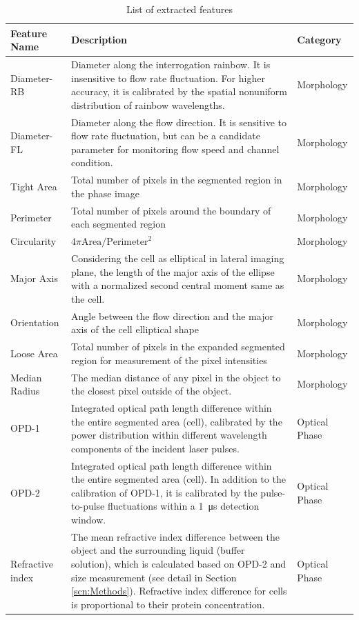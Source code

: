 \documentclass[aps,pra,reprint,longbibliography,superscriptaddress]{revtex4-1}
\begin{document}
\begin{table}[hb!]
\caption{\label{tbl:Features} List of extracted features}
\begin{tabular}{|p{}|p{}|p{}|}
\hline
Feature Name	 &Description	 &Category\\ \hline
Diameter-RB	 &Diameter along the interrogation rainbow. It is insensitive to flow rate fluctuation. For higher accuracy, it is calibrated by the spatial nonuniform distribution of rainbow wavelengths. 	 &Morphology\\ \hline
Diameter-FL	 &Diameter along the flow direction. It is sensitive to flow rate fluctuation, but can be a candidate parameter for monitoring flow speed and channel condition.	 &Morphology\\ \hline
Tight Area	 &Total number of pixels in the segmented region in the phase image	 &Morphology\\ \hline
Perimeter	 &Total number of pixels around the boundary of each segmented region	 &Morphology\\ \hline
Circularity	 &$4\pi \text{Area} / \text{Perimeter}^2$  &Morphology\\ \hline
Major Axis 	 &Considering the cell as elliptical in lateral imaging plane, the length of the major axis of the ellipse with a normalized second central moment same as the cell.	 &Morphology\\ \hline
Orientation	 &Angle between the flow direction and the major axis of the cell elliptical shape	 &Morphology\\ \hline
Loose Area	 &Total number of pixels in the expanded segmented region for measurement of the pixel intensities	 &Morphology\\ \hline
Median Radius	 &The median distance of any pixel in the object to the closest pixel outside of the object.	 &Morphology\\ \hline
OPD-1	 &Integrated optical path length difference within the entire segmented area (cell), calibrated by the power distribution within different wavelength components of the incident laser pulses.	 &Optical Phase\\ \hline
OPD-2	 &Integrated optical path length difference within the entire segmented area (cell). In addition to the calibration of OPD-1, it is calibrated by the pulse-to-pulse fluctuations within a \SI{1}{\micro\second} detection window.	 &Optical Phase\\ \hline
Refractive index	 &The mean refractive index difference between the object and the surrounding liquid (buffer solution), which is calculated based on OPD-2 and size measurement (see detail in Section \ref{scn:Methods}). Refractive index difference for cells is proportional to their protein concentration.	 &Optical Phase\\ \hline

\end{tabular}
\end{table}
\end{document}
